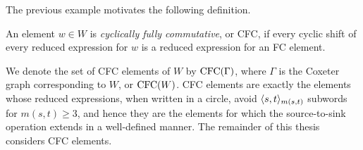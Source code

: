     The previous example motivates the following definition.

\begin{definition}\label{def:CFC} An element $w \in W$ is \emph{cyclically fully commutative}, or CFC, if every cyclic shift of every reduced expression for $w$ is a reduced expression for an FC element.
\end{definition}

    We denote the set of CFC elements of $W$ by $\operatorname{\mathrm{CFC}}(\Gamma)$, where $\Gamma$ is the Coxeter graph corresponding to $W$, or $\operatorname{\mathrm{CFC}}(W)$.
    CFC elements are exactly the elements whose reduced expressions, when written in a circle, avoid $\langle s,t \rangle_{m(s,t)}$ subwords for $m(s,t) \geq 3$, and hence they are the elements for which the source-to-sink operation extends in a well-defined manner.
    The remainder of this thesis considers CFC elements.
    
